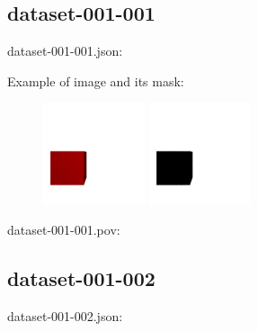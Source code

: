 \subsection{dataset-001-001}

dataset-001-001.json:
\begin{scriptsize}
\begin{ttfamily}

\end{ttfamily}
\end{scriptsize}

Example of image and its mask:
\begin{center}
\begin{figure}[H]
\centering\includegraphics[width=3cm]{./img-001-001.png}
\centering\includegraphics[width=3cm]{./mask-001-001.png}
\end{figure}
\end{center}

dataset-001-001.pov:
\begin{scriptsize}
\begin{ttfamily}

\end{ttfamily}
\end{scriptsize}

\subsection{dataset-001-002}

dataset-001-002.json:
\begin{scriptsize}
\begin{ttfamily}

\end{ttfamily}
\end{scriptsize}

